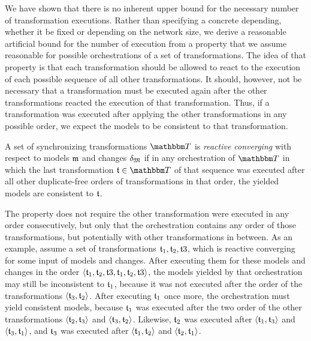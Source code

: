 We have shown that there is no inherent upper bound for the necessary number of transformation executions.
Rather than specifying a concrete depending, whether it be fixed or depending on the network size, we derive a reasonable artificial bound for the number of execution from a property that we assume reasonable for possible orchestrations of a set of transformations.
The idea of that property is that each transformation should be allowed to react to the execution of each possible sequence of all other transformations.
It should, however, not be necessary that a transformation must be executed again after the other transformations reacted the execution of that transformation.
Thus, if a transformation was executed after applying the other transformations in any possible order, we expect the models to be consistent to that transformation.

\begin{definition}
    \label{def:reactiveconverging}
    A set of synchronizing transformations $\transformationset{T}$ is \emph{reactive converging} with respect to models $\mathfrak{m}$ and changes $\mathfrak{\delta}_{\mathfrak{M}}$ if in any orchestration of $\transformationset{T}$ in which the last transformation $\transformation{t} \in \transformationset{T}$ of that sequence was executed after all other duplicate-free orders of transformations in that order, the yielded models are consistent to $\mathfrak{t}$.
\end{definition}

The property does not require the other transformation were executed in any order consecutively, but only that the orchestration contains any order of those transformations, but potentially with other transformations in between.
As an example, assume a set of transformations $\mathfrak{t}_{1}, \mathfrak{t}_{2}, \mathfrak{t}{3}$, which is reactive converging for some input of models and changes.
After executing them for these models and changes in the order $\langle \mathfrak{t}_{1}, \mathfrak{t}_{2}, \mathfrak{t}{3}, \mathfrak{t}_{1}, \mathfrak{t}_{2}, \mathfrak{t}{3} \rangle$, the models yielded by that orchestration may still be inconsistent to $\mathfrak{t}_{1}$, because it was not executed after the order of the transformations $\langle \mathfrak{t}_{3}, \mathfrak{t}_{2} \rangle$.
After executing $\mathfrak{t}_{1}$ once more, the orchestration must yield consistent models, because $\mathfrak{t}_{1}$ was executed after the two order of the other transformations $\langle \mathfrak{t}_{2}, \mathfrak{t}_{3} \rangle$ and $\langle \mathfrak{t}_{3}, \mathfrak{t}_{2} \rangle$.
Likewise, $\mathfrak{t}_{2}$ was executed after $\langle \mathfrak{t}_{1}, \mathfrak{t}_{3} \rangle$ and $\langle \mathfrak{t}_{3}, \mathfrak{t}_{1} \rangle$, and $\mathfrak{t}_{3}$ was executed after $\langle \mathfrak{t}_{1}, \mathfrak{t}_{2} \rangle$ and $\langle \mathfrak{t}_{2}, \mathfrak{t}_{1} \rangle$.


